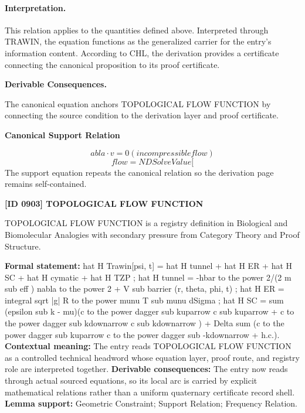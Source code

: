 \paragraph{Interpretation.}
This relation applies to the quantities defined above. Interpreted through TRAWIN, the equation functions as the generalized carrier for the entry’s information content. According to CHL, the derivation provides a certificate connecting the canonical proposition to its proof certificate.

\par\vspace{0.35em}
\noindent\textbf{Derivable Consequences.}\quad
\begingroup
\footnotesize
\raggedright
The canonical equation anchors TOPOLOGICAL FLOW FUNCTION by connecting the source condition to the derivation layer and proof certificate.
\par\endgroup

\noindent\textbf{Canonical Support Relation}\par
\[
abla \cdot v = 0 (incompressible flow)
\]
\[
flow = NDSolveValue[
\]
\noindent The support equation repeats the canonical relation so the derivation page remains self-contained.\par

\clearpage
\noindent\textbf{[ID 0903] TOPOLOGICAL FLOW FUNCTION}\par
\vspace{0.35em}
\begingroup\small
{}
TOPOLOGICAL FLOW FUNCTION is a registry definition in Biological and Biomolecular Analogies with secondary pressure from Category Theory and Proof Structure.

\begingroup\footnotesize\setlength{\emergencystretch}{3em}\sloppy
\textbf{Formal statement:} hat H Trawin[psi, t] = hat H tunnel + hat H ER + hat H SC + hat H cymatic + hat H TZP ; hat H tunnel = -hbar to the power 2/(2 m sub eff ) nabla to the power 2 + V sub barrier (r, theta, phi, t) ; hat H ER = integral sqrt |g| R to the power munu T sub munu dSigma ; hat H SC = sum (epsilon sub k - mu)(c to the power dagger sub kuparrow c sub kuparrow + c to the power dagger sub kdownarrow c sub kdownarrow ) + Delta sum (c to the power dagger sub kuparrow c to the power dagger sub -kdownarrow + h.c.). \textbf{Contextual meaning:} The entry reads TOPOLOGICAL FLOW FUNCTION as a controlled technical headword whose equation layer, proof route, and registry role are interpreted together. \textbf{Derivable consequences:} The entry now reads through actual sourced equations, so its local arc is carried by explicit mathematical relations rather than a uniform quaternary certificate record shell. \textbf{Lemma support:} Geometric Constraint; Support Relation; Frequency Relation.\par
\endgroup

